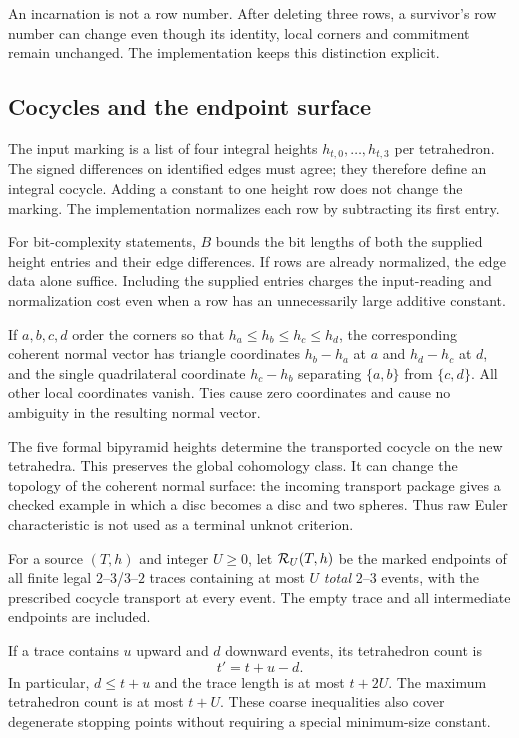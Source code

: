 An incarnation is not a row number. After deleting three rows, a survivor's
row number can change even though its identity, local corners and commitment
remain unchanged. The implementation keeps this distinction explicit.

\subsection{Cocycles and the endpoint surface}

The input marking is a list of four integral heights $h_{t,0},\dots,h_{t,3}$
per tetrahedron. The signed differences on identified edges must agree; they
therefore define an integral cocycle. Adding a constant to one height row
does not change the marking. The implementation normalizes each row by
subtracting its first entry.

For bit-complexity statements, $B$ bounds the bit lengths of both the supplied
height entries and their edge differences. If rows are already normalized,
the edge data alone suffice. Including the supplied entries charges the
input-reading and normalization cost even when a row has an unnecessarily
large additive constant.

If $a,b,c,d$ order the corners so that
$h_a\le h_b\le h_c\le h_d$, the corresponding coherent normal vector has
triangle coordinates $h_b-h_a$ at $a$ and $h_d-h_c$ at $d$, and the single
quadrilateral coordinate $h_c-h_b$ separating $\{a,b\}$ from $\{c,d\}$.
All other local coordinates vanish. Ties cause zero coordinates and cause no
ambiguity in the resulting normal vector.

The five formal bipyramid heights determine the transported cocycle on the
new tetrahedra. This preserves the global cohomology class. It can change the
topology of the coherent normal surface: the incoming transport package gives
a checked example in which a disc becomes a disc and two spheres. Thus raw
Euler characteristic is not used as a terminal unknot criterion.

\begin{definition}
For a source $(T,h)$ and integer $U\ge0$, let $\mathcal R_U(T,h)$ be the marked
endpoints of all finite legal $2$--$3$/$3$--$2$ traces containing at most $U$
\emph{total} $2$--$3$ events, with the prescribed cocycle transport at every
event. The empty trace and all intermediate endpoints are included.
\end{definition}

If a trace contains $u$ upward and $d$ downward events, its tetrahedron count is
\begin{equation}\label{eq:tet-account}
 t'=t+u-d.
\end{equation}
In particular, $d\le t+u$ and the trace length is at most $t+2U$. The maximum
tetrahedron count is at most $t+U$. These coarse inequalities also cover
degenerate stopping points without requiring a special minimum-size constant.

